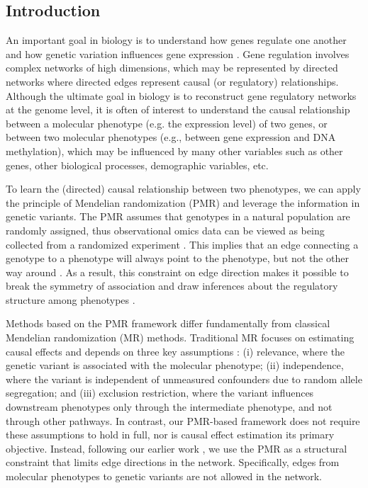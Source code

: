 \documentclass[12pt,letterpaper]{report}
\begin{document}
\begin{doublespace}
\setcounter{section}{0}
\section{Introduction}

An important goal in biology is to understand how genes regulate one another and how genetic variation influences gene expression \cite{camacho2018next, pingault2018using, xu2019machine, lecca2021machine}. Gene regulation involves complex networks of high dimensions, which may be represented by directed networks where directed edges represent causal (or regulatory) relationships. Although the ultimate goal in biology is to reconstruct gene regulatory networks at the genome level, it is often of interest to understand the causal relationship between a molecular phenotype (e.g. the expression level) of two genes, or between two molecular phenotypes (e.g., between gene expression and DNA methylation), which may be influenced by many other variables such as other genes, other biological processes, demographic variables, etc.

To learn the (directed) causal relationship between two phenotypes, we can apply the principle of Mendelian randomization (PMR) and leverage the information in genetic variants. The PMR assumes that genotypes in a natural population are randomly assigned, thus observational omics data can be viewed as being collected from a randomized experiment \cite{davey2014mendelian, aten2008using}. This implies that an edge connecting a genotype to a phenotype will always point to the phenotype, but not the other way around \cite{badsha2019learning, yazdani2016generating}. As a result, this constraint on edge direction makes it possible to break the symmetry of association and draw inferences about the regulatory structure among phenotypes \cite{davey2014mendelian, badsha2019learning, ludl2021comparison}.   

Methods based on the PMR framework differ fundamentally from classical Mendelian randomization (MR) methods. 
Traditional MR focuses on estimating causal effects and depends on three key assumptions 
\cite{davey2014mendelian, vanderweele2014mr, emdin2017mrreview}: (i) relevance, where the genetic variant is 
associated with the molecular phenotype; (ii) independence, where the variant is independent of unmeasured 
confounders due to random allele segregation; and (iii) exclusion restriction, where the variant influences downstream 
phenotypes only through the intermediate phenotype, and not through other pathways.
In contrast, our PMR-based framework does not require these assumptions to hold in full, nor is causal effect estimation 
its primary objective. Instead, following our earlier work \cite{badsha2019learning, badsha2021mrpc, kvamme2025cistrans}, we use the PMR 
as a structural constraint that limits edge directions in the network. Specifically, edges from molecular phenotypes to 
genetic variants are not allowed in the network. 


\end{doublespace}
\end{document}
